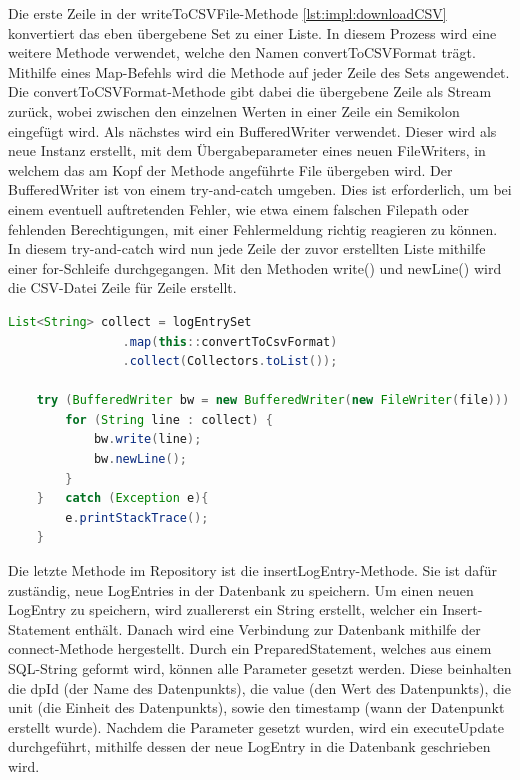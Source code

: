 Die erste Zeile in der writeToCSVFile-Methode \ref{lst:impl:downloadCSV} konvertiert das eben übergebene Set zu einer Liste. In diesem Prozess wird eine weitere Methode verwendet, welche den Namen convertToCSVFormat trägt. Mithilfe eines Map-Befehls wird die Methode auf jeder Zeile des Sets angewendet. Die convertToCSVFormat-Methode gibt dabei die übergebene Zeile als Stream zurück, wobei zwischen den einzelnen Werten in einer Zeile ein Semikolon eingefügt wird.
Als nächstes wird ein BufferedWriter verwendet. Dieser wird als neue Instanz erstellt, mit dem Übergabeparameter eines neuen FileWriters, in welchem das am Kopf der Methode angeführte File übergeben wird. Der BufferedWriter ist von einem try-and-catch umgeben. Dies ist erforderlich, um bei einem eventuell auftretenden Fehler, wie etwa einem falschen Filepath oder fehlenden Berechtigungen, mit einer Fehlermeldung richtig reagieren zu können. In diesem try-and-catch wird nun jede Zeile der zuvor erstellten Liste mithilfe einer for-Schleife durchgegangen. Mit den Methoden write() und newLine() wird die CSV-Datei Zeile für Zeile erstellt.

\begin{lstlisting}[language=java,caption=CSV-File herunterladen,label=lst:impl:downloadCSV]
    List<String> collect = logEntrySet
                .map(this::convertToCsvFormat)
                .collect(Collectors.toList());
        
    try (BufferedWriter bw = new BufferedWriter(new FileWriter(file))) {
        for (String line : collect) {
            bw.write(line);
            bw.newLine();
        }
    }   catch (Exception e){
        e.printStackTrace();
    }
\end{lstlisting}

Die letzte Methode im Repository ist die insertLogEntry-Methode. Sie ist dafür zuständig, neue LogEntries in der Datenbank zu speichern. Um einen neuen LogEntry zu speichern, wird zuallererst ein String erstellt, welcher ein Insert-Statement enthält.
Danach wird eine Verbindung zur Datenbank mithilfe der connect-Methode hergestellt. Durch ein PreparedStatement, welches aus einem SQL-String geformt wird, können alle Parameter gesetzt werden. Diese beinhalten die dpId (der Name des Datenpunkts), die value (den Wert des Datenpunkts), die unit (die Einheit des Datenpunkts), sowie den timestamp (wann der Datenpunkt erstellt wurde). Nachdem die Parameter gesetzt wurden, wird ein executeUpdate durchgeführt, mithilfe dessen der neue LogEntry in die Datenbank geschrieben wird.
 
